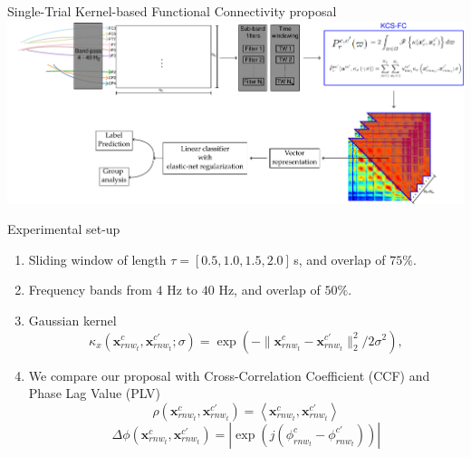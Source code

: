 \documentclass[aspectratio=169]{beamer}
\begin{document}
\begin{frame}{Single-Trial Kernel-based Functional Connectivity proposal}
    \includegraphics[scale=0.5]{../Tesis_document/Figures/outline_and_contributions/contribution1_C.pdf}
\end{frame}

\begin{frame}{Experimental set-up}
    \begin{enumerate}
        \item Sliding window of length $\tau=[0.5,1.0,1.5,2.0]$\,{s}, and overlap of $75\%$.
        \item Frequency bands from $4$ Hz to $40$ Hz, and overlap of $50\%$.
        \item Gaussian kernel
        \[
        \kappa_x\left(\mathbf{x}^{c}_{rnw_t}, \mathbf{x}^{c'}_{rnw_t};\sigma\right) = \exp{\left( {-\|\mathbf{x}^{c}_{rnw_t}-\mathbf{x}^{c'}_{rnw_t}\|^2_2}/{2\sigma^2}\right)},
        \]
        \item We compare our proposal with {Cross-Correlation Coefficient} (CCF) and {Phase Lag Value} (PLV)
        \[
        \rho(\mathbf{x}^{c}_{rnw_t},\mathbf{x}^{c'}_{rnw_t}) ={\left<\mathbf{x}^{c}_{rnw_t},\mathbf{x}^{c'}_{rnw_t}\right>}
        \]
        \[
        \Delta\phi(\mathbf{x}^{c}_{rnw_t},\mathbf{x}^{c'}_{rnw_t}) = {|\exp(j(\phi_{rnw_t}^{c}-\phi_{rnw_t}^{c'}))|}
        \]
    \end{enumerate}
\end{frame}
\end{document}
